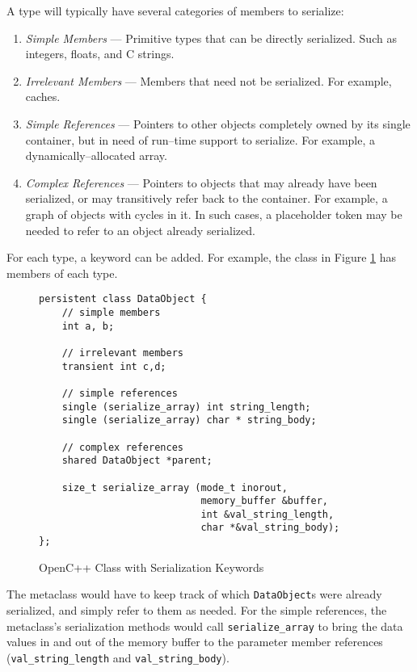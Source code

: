 	A type will typically have several categories of members to serialize:
	\begin{enumerate}
	\item \emph{Simple Members} --- Primitive types that can be directly serialized.  Such as integers, floats, and C strings.
	\item \emph{Irrelevant Members} --- Members that need not be serialized.  For example, caches.
	\item \emph{Simple References} --- Pointers to other objects completely owned by its single container, but in need of run--time support to serialize.  For example, a dynamically--allocated array.
	\item \emph{Complex References} --- Pointers to objects that may already have been serialized, or may transitively refer back to the container.  For example, a graph of objects with cycles in it.  In such cases, a placeholder token may be needed to refer to an object already serialized.
	\end{enumerate}

	For each type, a keyword can be added.  For example, the class in Figure \ref{fig:ocpp-class-keyw} has members of each type.

\begin{figure}[ht!]
\begin{verbatim}
persistent class DataObject {
    // simple members
    int a, b;
    
    // irrelevant members
    transient int c,d;
    
    // simple references
    single (serialize_array) int string_length;
    single (serialize_array) char * string_body;
    
    // complex references
    shared DataObject *parent;
    
    size_t serialize_array (mode_t inorout,
                            memory_buffer &buffer,
                            int &val_string_length, 
                            char *&val_string_body);
};
\end{verbatim}
\caption{OpenC++ Class with Serialization Keywords}
\label{fig:ocpp-class-keyw}
\end{figure}

	The metaclass would have to keep track of which \texttt{DataObject}s were already serialized, and simply refer to them as needed.  For the simple references, the metaclass's serialization methods would call \texttt{serialize\_array} to bring the data values in and out of the memory buffer to the parameter member references (\texttt{val\_string\_length} and \texttt{val\_string\_body}).

